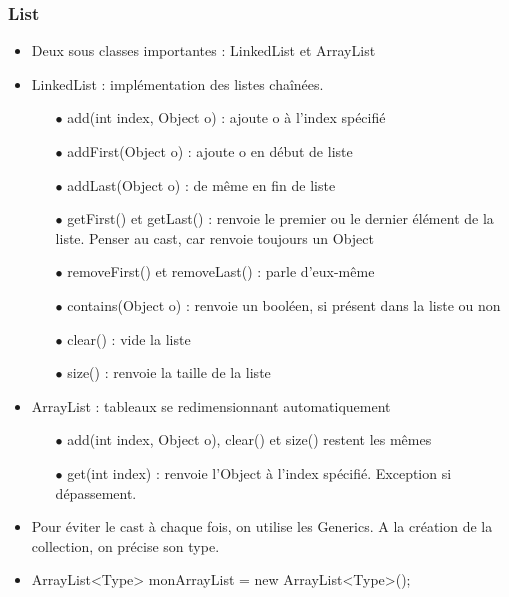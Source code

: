 \subsubsection{List}
\begin{itemize}
	\item Deux sous classes importantes : LinkedList et ArrayList
	\item LinkedList : implémentation des listes chaînées.
		\begin{itemize}
			\item[$\bullet$] add(int index, Object o) : ajoute o à l'index spécifié
			\item[$\bullet$] addFirst(Object o) : ajoute o en début de liste
			\item[$\bullet$]  addLast(Object o) : de même en fin de liste
			\item[$\bullet$]  getFirst() et getLast() : renvoie le premier ou le dernier élément de la liste. Penser au cast, car renvoie toujours un Object
			\item[$\bullet$]  removeFirst() et removeLast() : parle d'eux-même
			\item[$\bullet$]  contains(Object o) : renvoie un booléen, si présent dans la liste ou non
			\item[$\bullet$]  clear() : vide la liste
			\item[$\bullet$]  size() : renvoie la taille de la liste
		\end{itemize}
	\item ArrayList : tableaux se redimensionnant automatiquement
		\begin{itemize}
			\item[$\bullet$]  add(int index, Object o), clear() et size() restent les mêmes
			\item[$\bullet$]  get(int index) : renvoie l'Object à l'index spécifié. Exception si dépassement.
		\end{itemize}
	\item Pour éviter le cast à chaque fois, on utilise les Generics. A la création de la collection, on précise son type.
	\item ArrayList<Type> monArrayList = new ArrayList<Type>();
\end{itemize}


